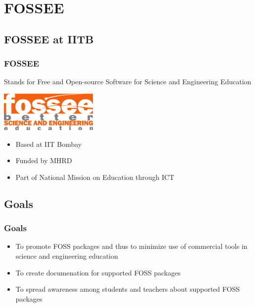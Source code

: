 \documentclass[compress,red]{beamer} %
\begin{document}
\section{FOSSEE}

\subsection{FOSSEE at IITB}
\begin{frame}
\frametitle{FOSSEE}
\begin{block}{Stands for}
Free and Open-source Software for Science and Engineering
Education \pause
\end{block}
\begin{center}
\vspace*{0.25cm}
\includegraphics[scale=2]{fossee.png} \pause
\end{center}
\vspace*{0.25cm}
\begin{itemize}
\item Based at IIT Bombay \pause
\item Funded by MHRD \pause
\item Part of National Mission on Education through ICT 
\end{itemize}
\end{frame}

\subsection{Goals}
\begin{frame}
\frametitle{Goals}
\begin{itemize}
\item To promote \alert{FOSS} packages and thus to minimize use of commercial tools in science and engineering education \pause
\item To create documenation for supported \alert{FOSS} packages \pause
\item To spread awareness among students and teachers about supported \alert{FOSS} packages   
\end{itemize}
\end{frame}
\end{document}
